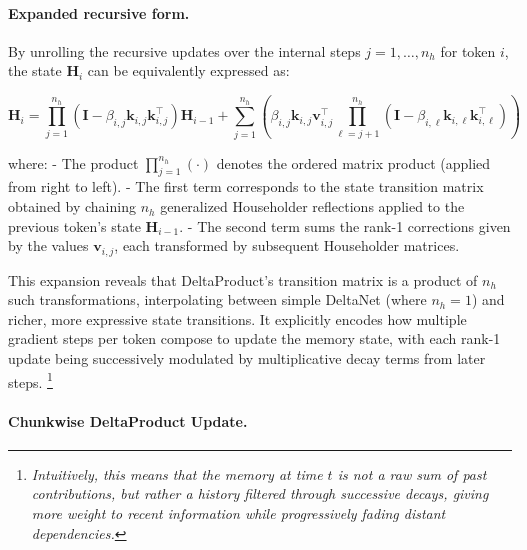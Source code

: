 \documentclass[10pt,a4paper]{article}
\begin{document}
\paragraph{Expanded recursive form.}

By unrolling the recursive updates over the internal steps \(j = 1, \ldots, n_h\) for token \(i\), the state \(\mathbf{H}_i\) can be equivalently expressed as:

\begin{equation}
\mathbf{H}_i = \prod_{j=1}^{n_h} \left(\mathbf{I} - \beta_{i,j} \mathbf{k}_{i,j} \mathbf{k}_{i,j}^\top \right) \mathbf{H}_{i-1} 
+ \sum_{j=1}^{n_h} \left( \beta_{i,j} \mathbf{k}_{i,j} \mathbf{v}_{i,j}^\top \prod_{\ell = j+1}^{n_h} \left(\mathbf{I} - \beta_{i,\ell} \mathbf{k}_{i,\ell} \mathbf{k}_{i,\ell}^\top \right) \right)
\end{equation}

where:
- The product \(\prod_{j=1}^{n_h} (\cdot)\) denotes the ordered matrix product (applied from right to left).
- The first term corresponds to the state transition matrix obtained by chaining \(n_h\) generalized Householder reflections applied to the previous token’s state \(\mathbf{H}_{i-1}\).
- The second term sums the rank-1 corrections given by the values \(\mathbf{v}_{i,j}\), each transformed by subsequent Householder matrices.
  
This expansion reveals that DeltaProduct’s transition matrix is a product of $n_h$ such transformations, interpolating between simple DeltaNet (where $n_h=1$) and richer, more expressive state transitions. It explicitly encodes how multiple gradient steps per token compose to update the memory state, with each rank-1 update being successively modulated by multiplicative decay terms from later steps. \footnote{\textit{Intuitively, this means that the memory at time $t$ is not a raw sum of past contributions, but rather a history filtered through successive decays, giving more weight to recent information while progressively fading distant dependencies.}}

\paragraph{Chunkwise DeltaProduct Update.}
\end{document}
